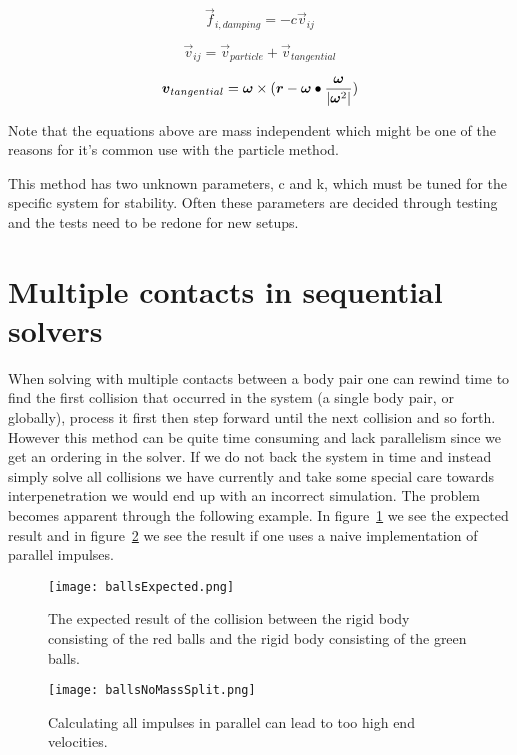 \begin{equation}
  \vec{f}_{i,damping} = -c\vec{v}_{ij}
\end{equation}

\begin{equation}
  \vec{v}_{ij} = \vec{v}_{particle} + \vec{v}_{tangential}
\end{equation}

\begin{equation}\label{eq:tangent}
  \boldsymbol{v}_{tangential} = \boldsymbol{\omega} \times ( \boldsymbol{r}- \boldsymbol{\omega}\bullet\frac{\boldsymbol{\omega}}{|\boldsymbol{\omega}^2|})
\end{equation}

Note that the equations above are mass independent which might be one of the
reasons for it's common use with the particle method.

This method has two unknown parameters, c and k, which must be tuned for the
specific system for stability. Often these parameters are decided through testing
and the tests need to be redone for new setups.

\section{Multiple contacts in sequential solvers}
When solving with multiple contacts between a body pair one can rewind time to
find the first collision
that occurred in the system (a single body pair, or globally), process it first
then step forward until the next collision and so forth. However this method can
be quite time consuming and lack parallelism since we get an ordering in the solver.
If we do not back the system in time and
instead simply solve all collisions we have currently and take some special care
towards interpenetration we would end up with an incorrect simulation. The problem
becomes apparent through the following example.
In figure~\ref{fig:ballsExpected} we see the expected result and in
figure~\ref{fig:noSplit} we see the result if one uses a naive implementation of
parallel impulses.

\begin{figure}[H]
  \centering
  \texttt{[image: ballsExpected.png]}
  \caption{The expected result of the collision between the rigid body consisting
  of the red balls and the rigid body consisting of the green balls.}
  \label{fig:ballsExpected}
\end{figure}

\begin{figure}[H]
  \centering
  \texttt{[image: ballsNoMassSplit.png]}
  \caption{Calculating all impulses in parallel can lead to too high end velocities.}
  \label{fig:noSplit}
\end{figure}

